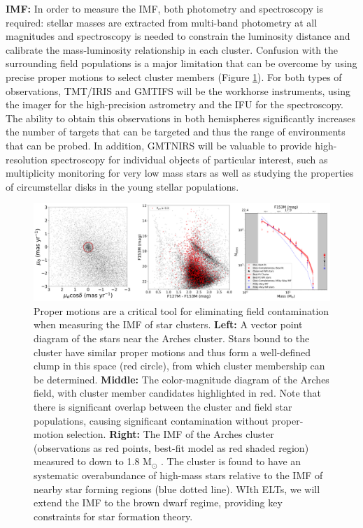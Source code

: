 \documentclass[11pt]{article}
\begin{document}
\telinstreq

\noindent
{\bf IMF:}
In order to measure the IMF, both photometry and spectroscopy is required: stellar masses are extracted from multi-band photometry at all magnitudes and spectroscopy is needed to constrain the luminosity distance and calibrate the mass-luminosity relationship in each cluster.
Confusion with the surrounding field populations is a major limitation that can be overcome by using precise proper motions to select cluster members (Figure \ref{fig:Arches_cmd}). 
For both types of observations, TMT/IRIS and GMTIFS will be the workhorse instruments, using the imager for the high-precision astrometry and the IFU for the spectroscopy.
The ability to obtain this observations in both hemispheres significantly increases the number of targets that can be targeted and thus the range of environments that can be probed. 
In addition, GMTNIRS will be valuable to provide high-resolution spectroscopy for individual objects of particular interest, such as multiplicity monitoring for very low mass stars as well as studying the properties of circumstellar disks in the young stellar populations.

 
 \begin{figure}
    \centering
    \includegraphics[scale=0.4]{Arches_IMF_3panel.png}
    \caption{Proper motions are a critical tool for eliminating field contamination when measuring the IMF of star clusters. {\bf Left:} A vector point diagram of the stars near the Arches cluster. Stars bound to the cluster have similar proper motions and thus form a well-defined clump in this space (red circle), from which cluster membership can be determined. {\bf Middle:} The color-magnitude diagram of the Arches field, with cluster member candidates highlighted in red. Note that there is significant overlap between the cluster and field star populations, causing significant contamination without proper-motion selection. {\bf Right:} The IMF of the Arches cluster (observations as red points, best-fit model as red shaded region) measured to down to 1.8 M$_{\odot}$ \citep{Hosek:2018b}. The cluster is found to have an systematic overabundance of high-mass stars relative to the IMF of nearby star forming regions (blue dotted line). WIth ELTs, we will extend the IMF to the brown dwarf regime, providing key constraints for star formation theory.}
    \label{fig:Arches_cmd}
\end{figure}
 
\end{document}
